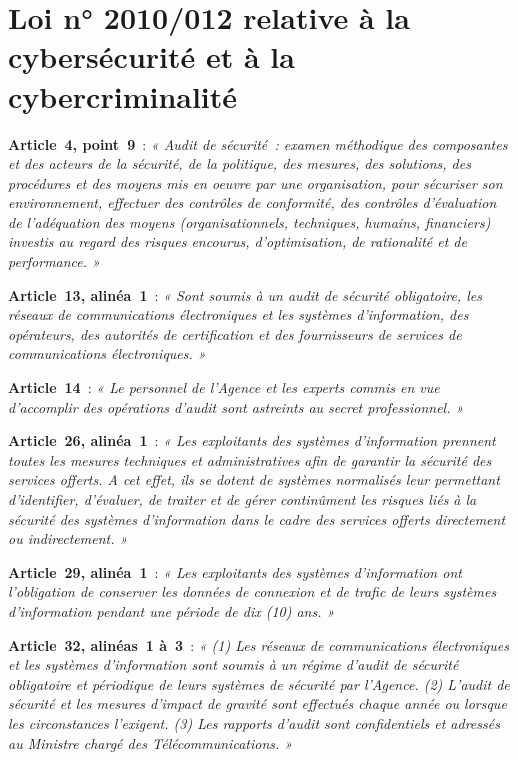 \section*{Loi n° 2010/012 relative à la cybersécurité et à la cybercriminalité}

\begin{boxjuris}
\textbf{Article~4, point~9}~: \textit{« Audit de sécurité~: examen
méthodique des composantes et des acteurs de la sécurité, de la politique,
des mesures, des solutions, des procédures et des moyens mis en oeuvre par
une organisation, pour sécuriser son environnement, effectuer des contrôles
de conformité, des contrôles d'évaluation de l'adéquation des moyens
(organisationnels, techniques, humains, financiers) investis au regard des
risques encourus, d'optimisation, de rationalité et de performance. »}

\medskip
\textbf{Article~13, alinéa~1}~: \textit{« Sont soumis à un audit de sécurité
obligatoire, les réseaux de communications électroniques et les systèmes
d'information, des opérateurs, des autorités de certification et des
fournisseurs de services de communications électroniques. »}

\medskip
\textbf{Article~14}~: \textit{« Le personnel de l'Agence et les experts
commis en vue d'accomplir des opérations d'audit sont astreints au secret
professionnel. »}

\medskip
\textbf{Article~26, alinéa~1}~: \textit{« Les exploitants des systèmes
d'information prennent toutes les mesures techniques et administratives afin
de garantir la sécurité des services offerts. A cet effet, ils se dotent de
systèmes normalisés leur permettant d'identifier, d'évaluer, de traiter et
de gérer continûment les risques liés à la sécurité des systèmes
d'information dans le cadre des services offerts directement ou
indirectement. »}

\medskip
\textbf{Article~29, alinéa~1}~: \textit{« Les exploitants des systèmes
d'information ont l'obligation de conserver les données de connexion et de
trafic de leurs systèmes d'information pendant une période de dix (10)
ans. »}

\medskip
\textbf{Article~32, alinéas~1 à~3}~: \textit{« (1) Les réseaux de
communications électroniques et les systèmes d'information sont soumis à un
régime d'audit de sécurité obligatoire et périodique de leurs systèmes de
sécurité par l'Agence. (2) L'audit de sécurité et les mesures d'impact de
gravité sont effectués chaque année ou lorsque les circonstances
l'exigent. (3) Les rapports d'audit sont confidentiels et adressés au
Ministre chargé des Télécommunications. »}


\end{boxjuris}
